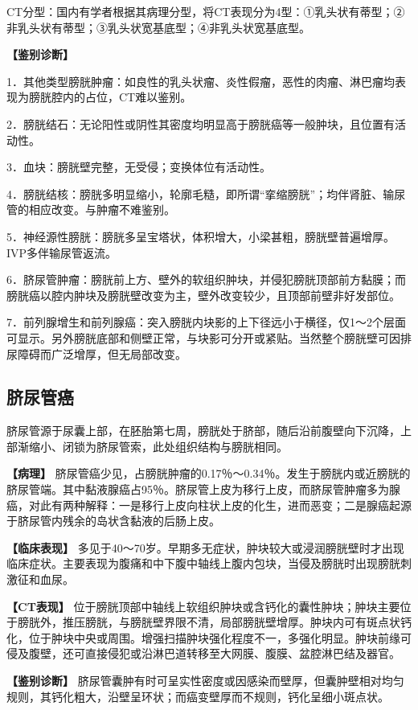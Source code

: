 CT分型：国内有学者根据其病理分型，将CT表现分为4型：①乳头状有蒂型；②非乳头状有蒂型；③乳头状宽基底型；④非乳头状宽基底型。

\textbf{【鉴别诊断】}

1．其他类型膀胱肿瘤：如良性的乳头状瘤、炎性假瘤，恶性的肉瘤、淋巴瘤均表现为膀胱腔内的占位，CT难以鉴别。

2．膀胱结石：无论阳性或阴性其密度均明显高于膀胱癌等一般肿块，且位置有活动性。

3．血块：膀胱壁完整，无受侵；变换体位有活动性。

4．膀胱结核：膀胱多明显缩小，轮廓毛糙，即所谓“挛缩膀胱”；均伴肾脏、输尿管的相应改变。与肿瘤不难鉴别。

5．神经源性膀胱：膀胱多呈宝塔状，体积增大，小梁甚粗，膀胱壁普遍增厚。IVP多伴输尿管返流。

6．脐尿管肿瘤：膀胱前上方、壁外的软组织肿块，并侵犯膀胱顶部前方黏膜；而膀胱癌以腔内肿块及膀胱壁改变为主，壁外改变较少，且顶部前壁非好发部位。

7．前列腺增生和前列腺癌：突入膀胱内块影的上下径远小于横径，仅1～2个层面可显示。另外膀胱底部和侧壁正常，与块影可分开或紧贴。当然整个膀胱壁可因排尿障碍而广泛增厚，但无局部改变。

\subsection{脐尿管癌}

脐尿管源于尿囊上部，在胚胎第七周，膀胱处于脐部，随后沿前腹壁向下沉降，上部渐缩小、闭锁为脐尿管索，此处组织结构与膀胱相同。

\textbf{【病理】}
脐尿管癌少见，占膀胱肿瘤的0.17％～0.34％。发生于膀胱内或近膀胱的脐尿管端。其中黏液腺癌占95％。脐尿管上皮为移行上皮，而脐尿管肿瘤多为腺癌，对此有两种解释：一是移行上皮向柱状上皮的化生，进而恶变；二是腺癌起源于脐尿管内残余的岛状含黏液的后肠上皮。

\textbf{【临床表现】}
多见于40～70岁。早期多无症状，肿块较大或浸润膀胱壁时才出现临床症状。主要表现为腹痛和中下腹中轴线上腹内包块，当侵及膀胱时出现膀胱刺激征和血尿。

\textbf{【CT表现】}
位于膀胱顶部中轴线上软组织肿块或含钙化的囊性肿块；肿块主要位于膀胱外，推压膀胱，与膀胱壁界限不清，局部膀胱壁增厚。肿块内可有斑点状钙化，位于肿块中央或周围。增强扫描肿块强化程度不一，多强化明显。肿块前缘可侵及腹壁，还可直接侵犯或沿淋巴道转移至大网膜、腹膜、盆腔淋巴结及器官。

\textbf{【鉴别诊断】}
脐尿管囊肿有时可呈实性密度或因感染而壁厚，但囊肿壁相对均匀规则，其钙化粗大，沿壁呈环状；而癌变壁厚而不规则，钙化呈细小斑点状。

